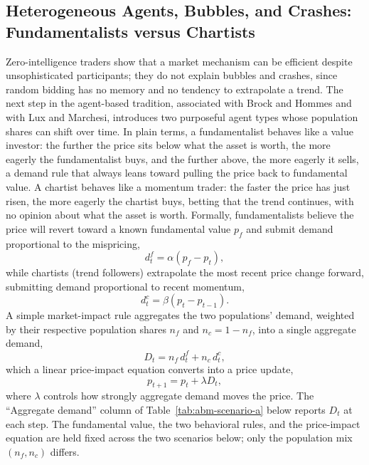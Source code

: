 \documentclass[../ai_in_finance]{subfiles}
\begin{document}
\subsection{Heterogeneous Agents, Bubbles, and Crashes: Fundamentalists versus Chartists}
\label{sec:abm-fundamentalist-chartist}

Zero-intelligence traders show that a market mechanism can be efficient despite unsophisticated participants; they do not explain bubbles and crashes, since random bidding has no memory and no tendency to extrapolate a trend. The next step in the agent-based tradition, associated with Brock and Hommes and with Lux and Marchesi, introduces two purposeful agent types whose population shares can shift over time. In plain terms, a fundamentalist behaves like a value investor: the further the price sits below what the asset is worth, the more eagerly the fundamentalist buys, and the further above, the more eagerly it sells, a demand rule that always leans toward pulling the price back to fundamental value. A chartist behaves like a momentum trader: the faster the price has just risen, the more eagerly the chartist buys, betting that the trend continues, with no opinion about what the asset is worth. Formally, fundamentalists believe the price will revert toward a known fundamental value $p_f$ and submit demand proportional to the mispricing,
\begin{equation}
d^f_t = \alpha (p_f - p_t),
\label{eq:abm-fundamentalist}
\end{equation}
while chartists (trend followers) extrapolate the most recent price change forward, submitting demand proportional to recent momentum,
\begin{equation}
d^c_t = \beta (p_t - p_{t-1}).
\label{eq:abm-chartist}
\end{equation}
A simple market-impact rule aggregates the two populations' demand, weighted by their respective population shares $n_f$ and $n_c = 1-n_f$, into a single aggregate demand,
\begin{equation*}
D_t = n_f\, d^f_t + n_c\, d^c_t,
\end{equation*}
which a linear price-impact equation converts into a price update,
\begin{equation}
p_{t+1} = p_t + \lambda D_t,
\label{eq:abm-price-update}
\end{equation}
where $\lambda$ controls how strongly aggregate demand moves the price. The ``Aggregate demand'' column of Table~\ref{tab:abm-scenario-a} below reports $D_t$ at each step. The fundamental value, the two behavioral rules, and the price-impact equation are held fixed across the two scenarios below; only the population mix $(n_f, n_c)$ differs.
\end{document}
